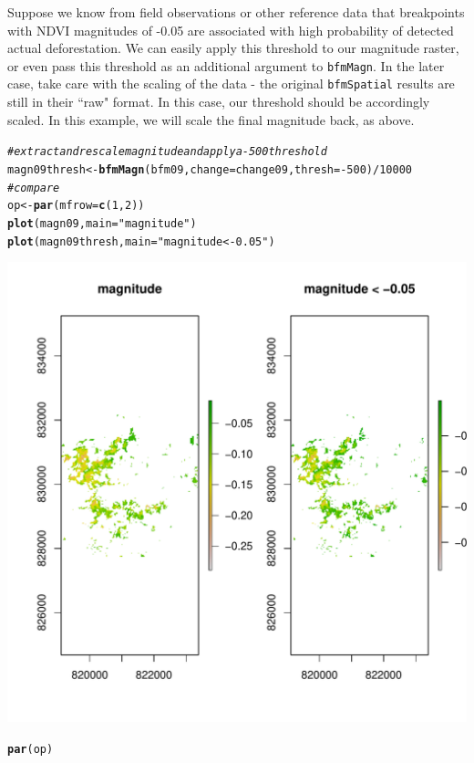 \documentclass{article}\usepackage[]{graphicx}\usepackage[]{color}
\makeatletter
\def\maxwidth{ %
  \ifdim\Gin@nat@width>\linewidth
    \linewidth
  \else
    \Gin@nat@width
  \fi
}
\newcommand{\hlnum}[1]{\textcolor[rgb]{0.686,0.059,0.569}{#1}}%
\newcommand{\hlstr}[1]{\textcolor[rgb]{0.192,0.494,0.8}{#1}}%
\newcommand{\hlcom}[1]{\textcolor[rgb]{0.678,0.584,0.686}{\textit{#1}}}%
\newcommand{\hlopt}[1]{\textcolor[rgb]{0,0,0}{#1}}%
\newcommand{\hlstd}[1]{\textcolor[rgb]{0.345,0.345,0.345}{#1}}%
\newcommand{\hlkwb}[1]{\textcolor[rgb]{0.69,0.353,0.396}{#1}}%
\newcommand{\hlkwc}[1]{\textcolor[rgb]{0.333,0.667,0.333}{#1}}%
\newcommand{\hlkwd}[1]{\textcolor[rgb]{0.737,0.353,0.396}{\textbf{#1}}}%
\newenvironment{kframe}{%
 \def\at@end@of@kframe{}%
 \ifinner\ifhmode%
  \def\at@end@of@kframe{\end{minipage}}%
  \begin{minipage}{\columnwidth}%
 \fi\fi%
 \def\FrameCommand##1{\hskip\@totalleftmargin \hskip-\fboxsep
 \colorbox{shadecolor}{##1}\hskip-\fboxsep
     \hskip-\linewidth \hskip-\@totalleftmargin \hskip\columnwidth}%
 \MakeFramed {\advance\hsize-\width
   \@totalleftmargin\z@ \linewidth\hsize
   \@setminipage}}%
 {\par\unskip\endMakeFramed%
 \at@end@of@kframe}
\newenvironment{knitrout}{}{} %
\def\code#1{\texttt{#1}}
\makeatother
\begin{document}
Suppose we know from field observations or other reference data that breakpoints with NDVI magnitudes of -0.05 are associated with high probability of detected actual deforestation. We can easily apply this threshold to our magnitude raster, or even pass this threshold as an additional argument to \code{bfmMagn}. In the later case, take care with the scaling of the data - the original \code{bfmSpatial} results are still in their ``raw" format. In this case, our threshold should be accordingly scaled. In this example, we will scale the final magnitude back, as above.

\begin{knitrout}
\color{fgcolor}\begin{kframe}
\begin{alltt}
\hlcom{# extract and rescale magnitude and apply a -500 threshold}
\hlstd{magn09thresh} \hlkwb{<-} \hlkwd{bfmMagn}\hlstd{(bfm09,} \hlkwc{change} \hlstd{= change09,} \hlkwc{thresh} \hlstd{=} \hlopt{-}\hlnum{500}\hlstd{)}\hlopt{/}\hlnum{10000}
\hlcom{# compare}
\hlstd{op} \hlkwb{<-} \hlkwd{par}\hlstd{(}\hlkwc{mfrow} \hlstd{=} \hlkwd{c}\hlstd{(}\hlnum{1}\hlstd{,} \hlnum{2}\hlstd{))}
\hlkwd{plot}\hlstd{(magn09,} \hlkwc{main} \hlstd{=} \hlstr{"magnitude"}\hlstd{)}
\hlkwd{plot}\hlstd{(magn09thresh,} \hlkwc{main} \hlstd{=} \hlstr{"magnitude < -0.05"}\hlstd{)}
\end{alltt}
\end{kframe}
\includegraphics[width=\maxwidth]{figure/bfmMagn-thresh} 
\begin{kframe}\begin{alltt}
\hlkwd{par}\hlstd{(op)}
\end{alltt}
\end{kframe}
\end{knitrout}
\end{document}
